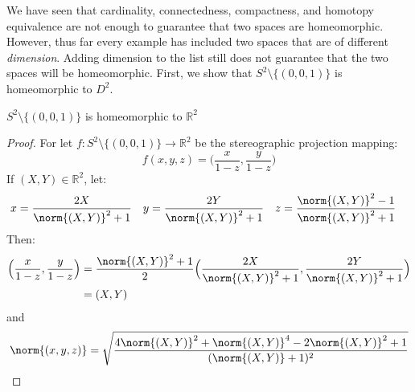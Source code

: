 \documentclass[crop=false,class=book,oneside]{standalone}                      %
\begin{document}
            We have seen that cardinality, connectedness, compactness, and
            homotopy equivalence are not enough to guarantee that two spaces are
            homeomorphic. However, thus far every example has included two
            spaces that are of different \textit{dimension}. Adding dimension to
            the list still does not guarantee that the two spaces will be
            homeomorphic. First, we show that $S^{2}\setminus\{(0,0,1)\}$ is
            homeomorphic to $D^{2}$.
            \begin{theorem}
                \label{thm:sphere_without_point_homeomorphic_to_plane}%
                $S^{2}\setminus\{(0,0,1)\}$ is homeomorphic to $\mathbb{R}^{2}$
            \end{theorem}
            \begin{proof}
                For let $f:S^{2}\setminus\{(0,0,1)\}\rightarrow \mathbb{R}^{2}$
                be the stereographic projection mapping:
                \begin{equation}
                    f(x,y,z)=\Big(\frac{x}{1-z},\frac{y}{1-z}\Big)
                \end{equation}
                If $(X,Y)\in\mathbb{R}^{2}$, let:
                \begin{align*}
                    x&=\frac{2X}{\norm{(X,Y)}^{2}+1}&
                    y&=\frac{2Y}{\norm{(X,Y)}^{2}+1}&
                    z&=\frac{\norm{(X,Y)}^{2}-1}{\norm{(X,Y)}^{2}+1} 
                \end{align*}
                Then:
                \begin{subequations}
                    \begin{align}
                        \Big(\frac{x}{1-z},\frac{y}{1-z}\Big)
                        &=\frac{\norm{(X,Y)}^{2}+1}{2}
                        \Big(\frac{2X}{\norm{(X,Y)}^{2}+ 1},
                             \frac{2Y}{\norm{(X,Y)}^{2}+1}\Big)\\
                        &=(X,Y)
                    \end{align}
                \end{subequations}
                and
                \begin{subequations}
                    \begin{align}
                        \norm{(x,y,z)}&=\sqrt{%
                            \frac{4\norm{(X,Y)}^{2}+\norm{(X,Y)}^{4}-
                                  2\norm{(X,Y)}^{2}+1}{(\norm{(X,Y)}+1)^{2}}%
                        }\\

\end{align}
\end{subequations}
\end{proof}
\end{document}
